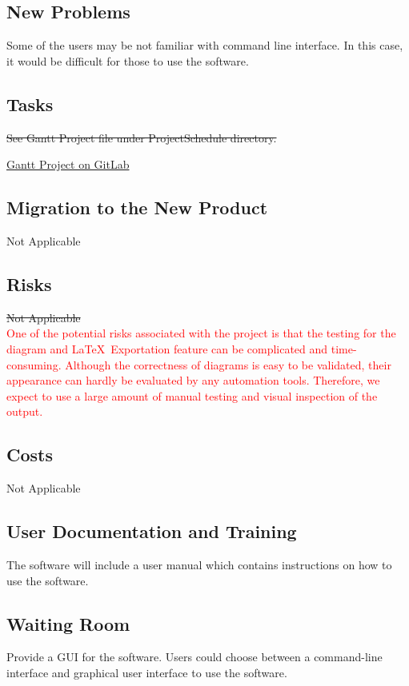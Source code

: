 \documentclass[12pt, titlepage]{article}
\begin{document}
\subsection{New Problems}

Some of the users may be not familiar with command line interface. In this case,
it would be difficult for those to use the software.

\subsection{Tasks}

\st{See Gantt Project file under ProjectSchedule directory.}

\href{https://gitlab.cas.mcmaster.ca/yex33/transitions_l02_grp16/-/blob/main/ProjectSchedule/Project%20Schedule.gan}{Gantt
  Project on GitLab}


\subsection{Migration to the New Product}
Not Applicable

\subsection{Risks}
\st{Not Applicable}\\
\textcolor{red}{One of the potential risks associated with the project is that
  the testing for the diagram and \LaTeX\ Exportation feature can be
  complicated and time-consuming. Although the correctness of diagrams is easy
  to be validated, their appearance can hardly be evaluated by any automation
  tools. Therefore, we expect to use a large amount of manual testing and visual
  inspection of the output.}

\subsection{Costs}
Not Applicable

\subsection{User Documentation and Training}
The software will include a user manual which contains instructions on how to
use the software.

\subsection{Waiting Room}
Provide a GUI for the software. Users could choose between a command-line
interface and graphical user interface to use the software.
\end{document}
